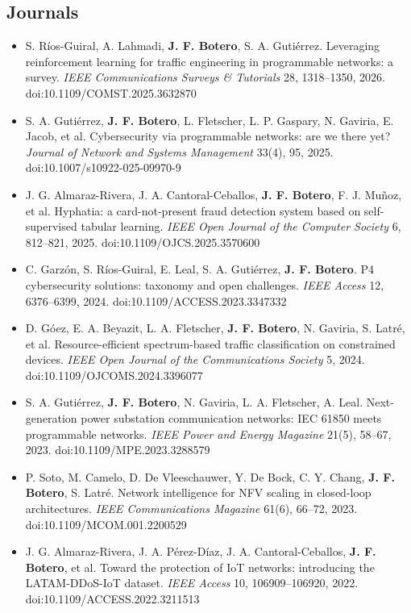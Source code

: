 \documentclass[10pt,a4paper]{article}
\newcommand{\me}{\textbf{J. F. Botero}}
\begin{document}
\subsection{Journals}
\begin{itemize}
\item S. Ríos-Guiral, A. Lahmadi, \me, S. A. Gutiérrez. Leveraging reinforcement learning for traffic engineering in programmable networks: a survey. \emph{IEEE Communications Surveys \& Tutorials} 28, 1318--1350, 2026. {\mono\footnotesize doi:10.1109/COMST.2025.3632870}
\item S. A. Gutiérrez, \me, L. Fletscher, L. P. Gaspary, N. Gaviria, E. Jacob, et al. Cybersecurity via programmable networks: are we there yet? \emph{Journal of Network and Systems Management} 33(4), 95, 2025. {\mono\footnotesize doi:10.1007/s10922-025-09970-9}
\item J. G. Almaraz-Rivera, J. A. Cantoral-Ceballos, \me, F. J. Muñoz, et al. Hyphatia: a card-not-present fraud detection system based on self-supervised tabular learning. \emph{IEEE Open Journal of the Computer Society} 6, 812--821, 2025. {\mono\footnotesize doi:10.1109/OJCS.2025.3570600}
\item C. Garzón, S. Ríos-Guiral, E. Leal, S. A. Gutiérrez, \me. P4 cybersecurity solutions: taxonomy and open challenges. \emph{IEEE Access} 12, 6376--6399, 2024. {\mono\footnotesize doi:10.1109/ACCESS.2023.3347332}
\item D. Góez, E. A. Beyazit, L. A. Fletscher, \me, N. Gaviria, S. Latré, et al. Resource-efficient spectrum-based traffic classification on constrained devices. \emph{IEEE Open Journal of the Communications Society} 5, 2024. {\mono\footnotesize doi:10.1109/OJCOMS.2024.3396077}
\item S. A. Gutiérrez, \me, N. Gaviria, L. A. Fletscher, A. Leal. Next-generation power substation communication networks: IEC 61850 meets programmable networks. \emph{IEEE Power and Energy Magazine} 21(5), 58--67, 2023. {\mono\footnotesize doi:10.1109/MPE.2023.3288579}
\item P. Soto, M. Camelo, D. De Vleeschauwer, Y. De Bock, C. Y. Chang, \me, S. Latré. Network intelligence for NFV scaling in closed-loop architectures. \emph{IEEE Communications Magazine} 61(6), 66--72, 2023. {\mono\footnotesize doi:10.1109/MCOM.001.2200529}
\item J. G. Almaraz-Rivera, J. A. Pérez-Díaz, J. A. Cantoral-Ceballos, \me, et al. Toward the protection of IoT networks: introducing the LATAM-DDoS-IoT dataset. \emph{IEEE Access} 10, 106909--106920, 2022. {\mono\footnotesize doi:10.1109/ACCESS.2022.3211513}

\end{itemize}
\end{document}
